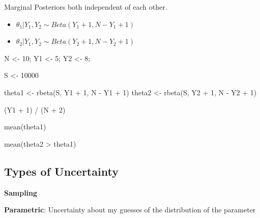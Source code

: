 \documentclass[11pt]{article}
\begin{document}
Marginal Posteriors both independent of each other.
\begin{itemize}
\item \(\theta_1 | Y_1, Y_2 \sim Beta(Y_1 + 1, N - Y_1 + 1)\)
\item \(\theta_2 | Y_1, Y_2 \sim Beta(Y_2 + 1, N - Y_2 + 1)\)
\end{itemize}

\begin{R}
N <- 10; Y1 <- 5; Y2 <- 8;

S <- 10000

theta1 <- rbeta(S, Y1 + 1, N - Y1 + 1)
theta2 <- rbeta(S, Y2 + 1, N - Y2 + 1)

(Y1 + 1) / (N + 2)

mean(theta1)

mean(theta2 > theta1)
\end{R}

\subsection{Types of Uncertainty}
\label{sec:orgea39568}

\textbf{Sampling}

\textbf{Parametric}: Uncertainty about my guesses of the distribution of the parameter
\end{document}
